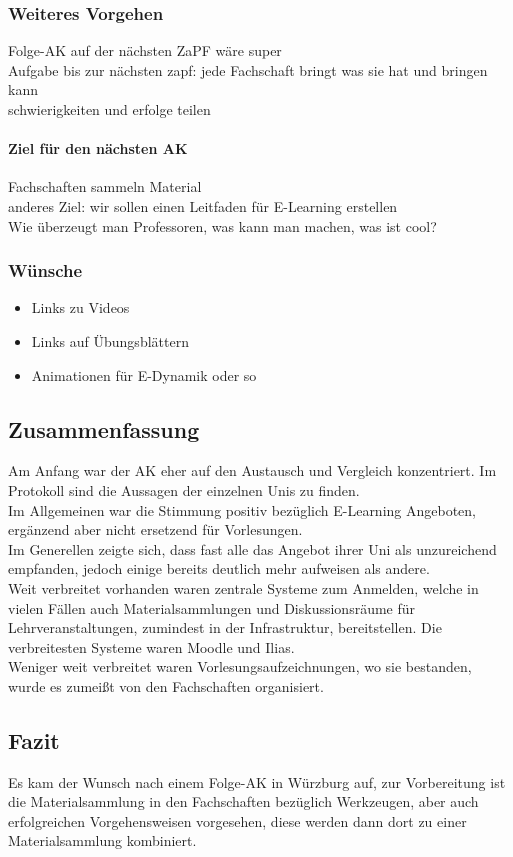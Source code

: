	\subsubsection*{Weiteres Vorgehen}
		Folge-AK auf der nächsten ZaPF wäre super \\
		Aufgabe bis zur nächsten zapf: jede Fachschaft bringt was sie hat und bringen kann \\
		schwierigkeiten und erfolge teilen

		\paragraph{Ziel für den nächsten AK}
			Fachschaften sammeln Material \\
			anderes Ziel: wir sollen einen Leitfaden für E-Learning erstellen \\

			Wie überzeugt man Professoren, was kann man machen, was ist cool?

	\subsubsection*{Wünsche}
		\begin{itemize}
			\item Links zu Videos
			\item Links auf Übungsblättern
			\item Animationen für E-Dynamik oder so
		\end{itemize}

	\subsection*{Zusammenfassung}
		Am Anfang war der AK eher auf den Austausch und Vergleich konzentriert. Im Protokoll sind die
		Aussagen der einzelnen Unis zu finden. \\

		Im Allgemeinen war die Stimmung positiv bezüglich E-Learning Angeboten, ergänzend aber nicht ersetzend
		für Vorlesungen. \\

		Im Generellen zeigte sich, dass fast alle das Angebot ihrer Uni als unzureichend empfanden,
		jedoch einige bereits deutlich mehr aufweisen als andere. \\

		Weit verbreitet vorhanden waren zentrale Systeme zum Anmelden, welche in vielen Fällen auch
		Materialsammlungen und Diskussionsräume für Lehrveranstaltungen, zumindest in der Infrastruktur,
		bereitstellen. Die verbreitesten Systeme waren Moodle und Ilias. \\

		Weniger weit verbreitet waren Vorlesungsaufzeichnungen, wo sie bestanden, wurde es zumeißt von den Fachschaften organisiert.

	\subsection*{Fazit}
		Es kam der Wunsch nach einem Folge-AK in Würzburg auf, zur Vorbereitung ist die Materialsammlung in
		den Fachschaften bezüglich Werkzeugen, aber auch erfolgreichen Vorgehensweisen vorgesehen,
		diese werden dann dort zu einer Materialsammlung kombiniert.

